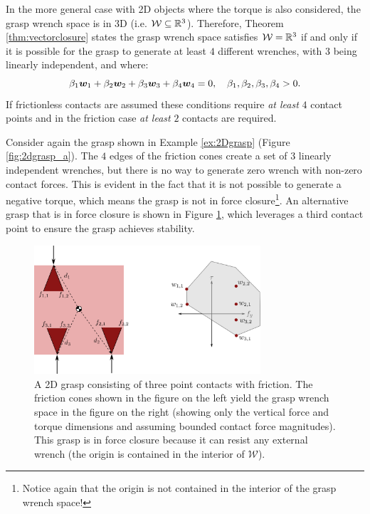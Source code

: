 \begin{example}[2D Object] \label{ex:2dobject}
In the more general case with 2D objects where the torque is also considered, the grasp wrench space is in 3D (i.e. $\mathcal{W} \subseteq \mathbb{R}^3$). Therefore, Theorem \ref{thm:vectorclosure} states the grasp wrench space satisfies $\mathcal{W} = \mathbb{R}^3$ if and only if it is possible for the grasp to generate at least $4$ different wrenches, with $3$ being linearly independent, and where:
\begin{equation*}
  \beta_1 \bm{w}_1 + \beta_2 \bm{w}_2 + \beta_3 \bm{w}_3 + \beta_4 \bm{w}_4 = 0, \quad \beta_1, \beta_2, \beta_3, \beta_4 > 0. 
\end{equation*}
If frictionless contacts are assumed these conditions require \textit{at least} $4$ contact points and in the friction case \textit{at least} $2$ contacts are required.

Consider again the grasp shown in Example \ref{ex:2Dgrasp} (Figure \ref{fig:2dgrasp_a}). The $4$ edges of the friction cones create a set of $3$ linearly independent wrenches, but there is no way to generate zero wrench with non-zero contact forces. This is evident in the fact that it is not possible to generate a negative torque, which means the grasp is not in force closure\footnote{Notice again that the origin is not contained in the interior of the grasp wrench space!}.
An alternative grasp that is in force closure is shown in Figure \ref{fig:2dgrasp_b}, which leverages a third contact point to ensure the grasp achieves stability.

\begin{figure}[ht]
\begin{center}
\includegraphics[width=0.75\textwidth]{tex/figs/ch26_figs/2Dexample_b.png}
\caption{A 2D grasp consisting of three point contacts with friction. The friction cones shown in the figure on the left yield the grasp wrench space in the figure on the right (showing only the vertical force and torque dimensions and assuming bounded contact force magnitudes). This grasp is in force closure because it can resist any external wrench (the origin is contained in the interior of $\mathcal{W}$).}
\label{fig:2dgrasp_b}
\end{center}
\end{figure}

\end{example}

